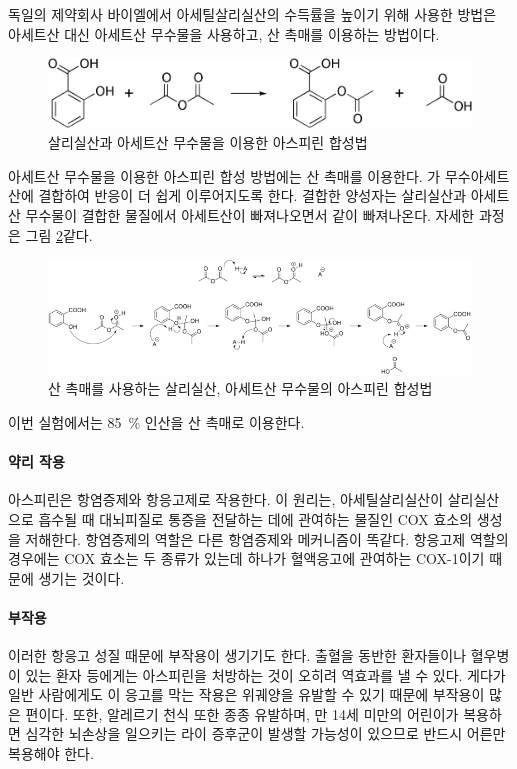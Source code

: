 \documentclass{GSHS-chemexp}
\begin{document}
	독일의 제약회사 바이엘에서 아세틸살리실산의 수득률을 높이기 위해
	사용한 방법은 아세트산 대신 아세트산 무수물을 사용하고,
	산 촉매를 이용하는 방법이다.
	\begin{figure}[H]
		\centering
		\includegraphics[width=\textwidth]{Aspirin_synthesis.png}
		\caption{살리실산과 아세트산 무수물을 이용한 아스피린 합성법}
		\label{fig:asp_form2}
	\end{figure}
	
	아세트산 무수물을 이용한 아스피린 합성 방법에는 산 촉매를 이용한다.
	가 무수아세트산에 결합하여 반응이 더 쉽게 이루어지도록 한다.
	결합한 양성자는 살리실산과 아세트산 무수물이 결합한 물질에서
	아세트산이 빠져나오면서 같이 빠져나온다.
	자세한 과정은 그림 \ref{fig:asp_form3}\과 같다.
	\begin{figure}[H]
		\centering
		\includegraphics[width=\textwidth]{800px-Acetylation_of_salicylic_acid,_mechanism.png}
		\caption{산 촉매를 사용하는 살리실산, 아세트산 무수물의 아스피린 합성법}
		\label{fig:asp_form3}
	\end{figure}
	
	이번 실험에서는 \SI{85}{\percent} 인산을 산 촉매로 이용한다.
	
	\paragraph{약리 작용}
	아스피린은 항염증제와 항응고제로 작용한다.
	이 원리는, 아세틸살리실산이 살리실산으로 흡수될 때
	대뇌피질로 통증을 전달하는 데에 관여하는 물질인
	COX 효소의 생성을 저해한다.
	항염증제의 역할은 다른 항염증제와 메커니즘이 똑같다.
	항응고제 역할의 경우에는 COX 효소는 두 종류가 있는데
	하나가 혈액응고에 관여하는 COX-1이기 때문에 생기는 것이다.
	
	\paragraph{부작용}
	이러한 항응고 성질 때문에 부작용이 생기기도 한다.
	출혈을 동반한 환자들이나 혈우병이 있는 환자 등에게는
	아스피린을 처방하는 것이 오히려 역효과를 낼 수 있다.
	게다가 일반 사람에게도 이 응고를 막는 작용은
	위궤양을 유발할 수 있기 때문에 부작용이 많은 편이다.
	또한, 알레르기 천식 또한 종종 유발하며,
	만 14세 미만의 어린이가 복용하면 심각한 뇌손상을 일으키는
	라이 증후군이 발생할 가능성이 있으므로 반드시 어른만 복용해야 한다.
	
\end{document}
